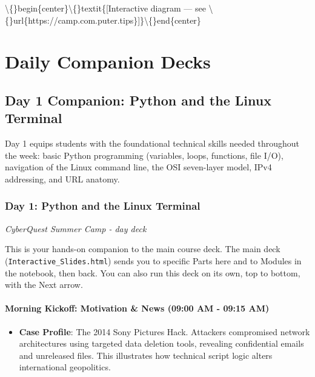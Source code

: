 \documentclass[12pt,openany]{book}
\begin{document}
\textbackslash\{\}begin\{center\}\textbackslash\{\}textit\{[Interactive diagram --- see \textbackslash\{\}url\{https://camp.com.puter.tips\}]\}\textbackslash\{\}end\{center\}













\part{Daily Companion Decks}
\chapter{Day 1 Companion: Python and the Linux Terminal}
Day 1 equips students with the foundational technical skills needed throughout the week: basic Python programming (variables, loops, functions, file I/O), navigation of the Linux command line, the OSI seven-layer model, IPv4 addressing, and URL anatomy.

\section*{Day 1: Python and the Linux Terminal}
{\small\itshape\color{gray}CyberQuest Summer Camp - day deck}


This is your hands-on companion to the main course deck. The main deck (\texttt{Interactive\_Slides.html}) sends you to specific Parts here and to Modules in the notebook, then back. You can also run this deck on its own, top to bottom, with the Next arrow.

\medskip

\subsection*{Morning Kickoff: Motivation \& News (09:00 AM - 09:15 AM)}


\begin{itemize}

  \item \textbf{Case Profile}: The 2014 Sony Pictures Hack. Attackers compromised network architectures using targeted data deletion tools, revealing confidential emails and unreleased files. This illustrates how technical script logic alters international geopolitics.

\end{itemize}
\end{document}
